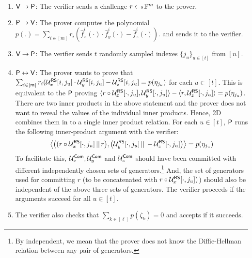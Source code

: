 \begin{enumerate}[{\rm 1.}]
\item $\mathsf{V}\rightarrow\mathsf{P}$: The verifier sends a challenge $r\hskip2.3pt{\gets\!\!\mbox{\tiny${\$}$\normalsize}}\,
\mathbb{F}^m$ to the prover.
\item $\mathsf{P}\rightarrow\mathsf{V}$: The prover computes the polynomial $p(.)=\sum_{i\in [m]}
r_i(\hat{f}^i_x(\cdot) \cdot \hat{f}^i_y(\cdot) - \hat{f}^i_z(\cdot))$.
and sends it to the verifier.

\item $\mathsf{V}\rightarrow\mathsf{P}$: The verifier sends $t$ randomly sampled indexes $\{j_u\}_{u\in [t]}$ from $[n]$. 

\item $\mathsf{P}\leftrightarrow\mathsf{V}$: The prover wants to prove that 
$\sum_{i\in [m]} r_i(\mathcal{U}^{\mathsf{RS}}_x[i,j_u] \cdot \mathcal{U}^{\mathsf{RS}}_y[i,j_u]-\mathcal{U}^{\mathsf{RS}}_z[i,j_u] = p(\eta_{j_u})$ for each $u \in [t]$.
This is equivalent to the $\mathsf{P}$ proving $\langle r \circ \mathcal{U}^{\mathsf{RS}}_x[\cdot,j_u],\mathcal{U}^{\mathsf{RS}}_y[\cdot,j_u]\rangle - \langle r,\mathcal{U}^{\mathsf{RS}}_z[\cdot,j_u]\rangle = p(\eta_{j_u})$. There are two inner products in the above statement and the prover does not want to reveal the values of the individual inner products. Hence, \name2D{} combines them in to a single inner product relation.
For each $u \in [t]$, $\mathsf{P}$ runs the following inner-product argument with the verifier: 
\[
\left\langle{\left( (r \circ \mathcal{U}^{\mathsf{RS}}_x[\cdot,j_u] \, || \, r \right)} , {\left( \mathcal{U}^{\mathsf{RS}}_y[\cdot,j_u] \, || \, -\mathcal{U}^{\mathsf{RS}}_z[\cdot,j_u] \right)} \right\rangle = p(\eta_{j_u})
\]
To facilitate this, $\mathcal{U}^{\mathsf{Com}}_x,\mathcal{U}^{\mathsf{Com}}_y$ and $\mathcal{U}^{\mathsf{Com}}_z$ should have been committed with different independently chosen sets of generators.\footnote{By independent, we mean that the prover does not know the Diffie-Hellman relation between any pair of generators.} And, the set of generators used for committing $r$ (to be concatenated with $r \circ \mathcal{U}^{\mathsf{RS}}_x[\cdot,j_u])$) should also be independent of the above three sets of generators.
The verifier proceeds if the arguments succeed for all $u \in [t]$.

\item The verifier also checks that $\sum_{k\in [\ell]}p(\zeta_k)=0$ and accepts if it succeeds.
\end{enumerate}







